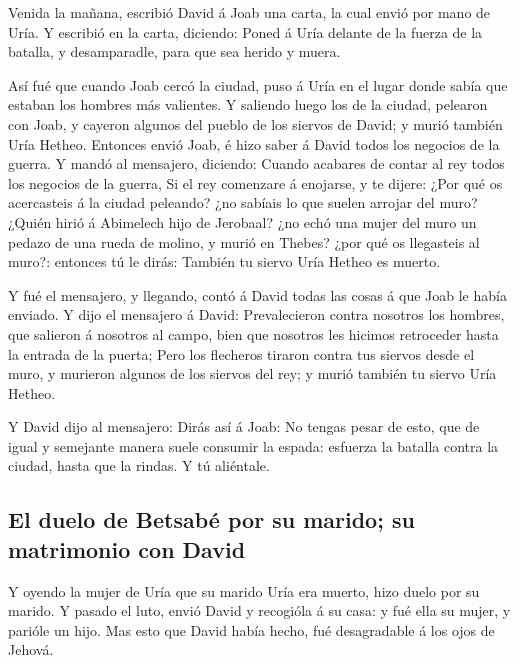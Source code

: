  Venida la mañana, escribió David á Joab una carta, la
cual envió por mano de Uría.  Y escribió en la carta,
diciendo: Poned á Uría delante de la fuerza de la batalla, y
desamparadle, para que sea herido y muera.

 Así fué que cuando Joab cercó la ciudad, puso á Uría en
el lugar donde sabía que estaban los hombres más valientes.
 Y saliendo luego los de la ciudad, pelearon con Joab, y
cayeron algunos del pueblo de los siervos de David; y murió también Uría
Hetheo.  Entonces envió Joab, é hizo saber á David todos
los negocios de la guerra.  Y mandó al mensajero,
diciendo: Cuando acabares de contar al rey todos los negocios de la
guerra,  Si el rey comenzare á enojarse, y te dijere:
¿Por qué os acercasteis á la ciudad peleando? ¿no sabíais lo que suelen
arrojar del muro?  ¿Quién hirió á Abimelech hijo de
Jerobaal? ¿no echó una mujer del muro un pedazo de una rueda de molino,
y murió en Thebes? ¿por qué os llegasteis al muro?: entonces tú le
dirás: También tu siervo Uría Hetheo es muerto.

 Y fué el mensajero, y llegando, contó á David todas las
cosas á que Joab le había enviado.  Y dijo el mensajero á
David: Prevalecieron contra nosotros los hombres, que salieron á
nosotros al campo, bien que nosotros les hicimos retroceder hasta la
entrada de la puerta;  Pero los flecheros tiraron contra
tus siervos desde el muro, y murieron algunos de los siervos del rey; y
murió también tu siervo Uría Hetheo.

 Y David dijo al mensajero: Dirás así á Joab: No tengas
pesar de esto, que de igual y semejante manera suele consumir la espada:
esfuerza la batalla contra la ciudad, hasta que la rindas. Y tú
aliéntale.

\hypertarget{el-duelo-de-betsabuxe9-por-su-marido-su-matrimonio-con-david}{%
\subsection{El duelo de Betsabé por su marido; su matrimonio con
David}\label{el-duelo-de-betsabuxe9-por-su-marido-su-matrimonio-con-david}}

 Y oyendo la mujer de Uría que su marido Uría era muerto,
hizo duelo por su marido.  Y pasado el luto, envió David
y recogióla á su casa: y fué ella su mujer, y parióle un hijo. Mas esto
que David había hecho, fué desagradable á los ojos de Jehová.

